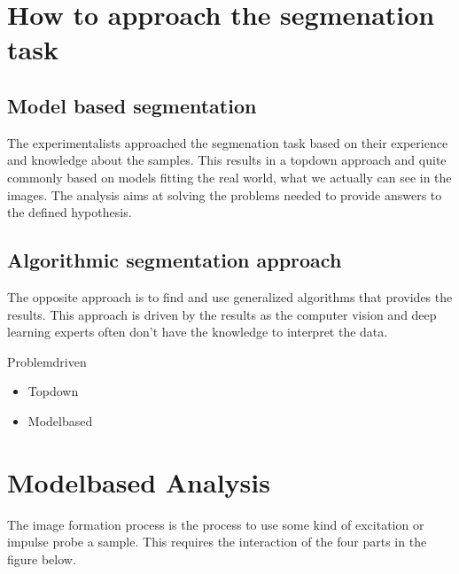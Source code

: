 \documentclass[letterpaper,10pt,english]{sphinxmanual}
\begin{document}
\sphinxAtStartPar
{}


\section{How to approach the segmenation task}
\label{\detokenize{04-BasicSegmentation:how-to-approach-the-segmenation-task}}

\subsection{Model based segmentation}
\label{\detokenize{04-BasicSegmentation:model-based-segmentation}}
\sphinxAtStartPar
The experimentalists approached the segmenation task based on their experience and knowledge about the samples. This results in a top\sphinxhyphen{}down approach and quite commonly based on models fitting the real world, what we actually can see in the images. The analysis aims at solving the problems needed to provide answers to the defined hypothesis.


\subsection{Algorithmic segmentation approach}
\label{\detokenize{04-BasicSegmentation:algorithmic-segmentation-approach}}
\sphinxAtStartPar
The opposite approach is to find and use generalized algorithms that provides the results. This approach is driven by the results as the computer vision and deep learning experts often don’t have the knowledge to interpret the data.



\sphinxAtStartPar
Problem\sphinxhyphen{}driven
\begin{itemize}
\item {} 
\sphinxAtStartPar
Top\sphinxhyphen{}down

\item {} 
\sphinxAtStartPar
{} Model\sphinxhyphen{}based

\end{itemize}




\section{Model\sphinxhyphen{}based Analysis}
\label{\detokenize{04-BasicSegmentation:model-based-analysis}}
\sphinxAtStartPar
The image formation process is the process to use some kind of excitation or impulse probe a sample. This requires the interaction of the four parts in the figure below.
\end{document}
